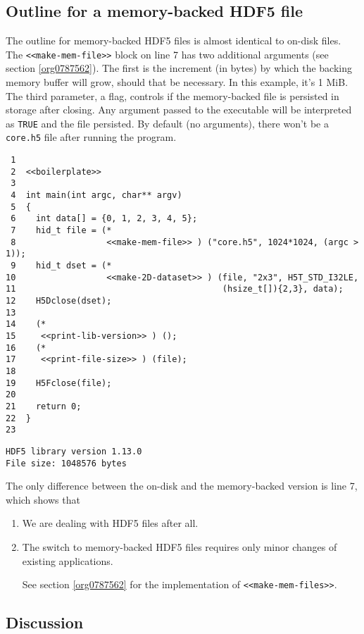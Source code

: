 \documentclass[a4paper, 12pt]{article}
\begin{document}
\subsection{Outline for a memory-backed HDF5 file}
\label{sec:org0a10949}

The outline for memory-backed HDF5 files is almost identical to on-disk
files. The \texttt{<<make-mem-file>>} block on line 7 has two
additional arguments (see section \ref{org0787562}). The first is the
increment (in bytes) by which the backing memory buffer will grow, should
that be necessary. In this example, it's 1 MiB. The third parameter, a flag,
controls if the memory-backed file is persisted in storage after closing.
Any argument passed to the executable will be interpreted as \texttt{TRUE} and the
file persisted. By default (no arguments), there won't be a \texttt{core.h5} file
after running the program.

\begin{verbatim}
 1
 2  <<boilerplate>>
 3
 4  int main(int argc, char** argv)
 5  {
 6    int data[] = {0, 1, 2, 3, 4, 5};
 7    hid_t file = (*
 8                  <<make-mem-file>> ) ("core.h5", 1024*1024, (argc > 1));
 9    hid_t dset = (*
10                  <<make-2D-dataset>> ) (file, "2x3", H5T_STD_I32LE,
11                                         (hsize_t[]){2,3}, data);
12    H5Dclose(dset);
13
14    (*
15     <<print-lib-version>> ) ();
16    (*
17     <<print-file-size>> ) (file);
18
19    H5Fclose(file);
20
21    return 0;
22  }
23
\end{verbatim}

\begin{verbatim}
HDF5 library version 1.13.0
File size: 1048576 bytes
\end{verbatim}

The only difference between the on-disk and the memory-backed version is
line 7, which shows that

\begin{enumerate}
\item We are dealing with HDF5 files after all.
\item The switch to memory-backed HDF5 files requires only minor changes of
existing applications.

See section \ref{org0787562} for the implementation of
\texttt{<<make-mem-files>>}.
\end{enumerate}

\subsection{Discussion}
\label{sec:orgbdd07eb}
\end{document}
